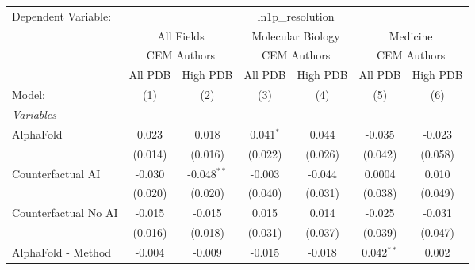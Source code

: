\begingroup
\centering
\begin{tabular}{lcccccc}
   \tabularnewline \midrule \midrule
   Dependent Variable: & \multicolumn{6}{c}{ln1p\_resolution}\\
 & \multicolumn{2}{c}{All Fields} & \multicolumn{2}{c}{Molecular Biology} & \multicolumn{2}{c}{Medicine} \\
\cmidrule(lr){2-3} \cmidrule(lr){4-5} \cmidrule(lr){6-7}
 & \multicolumn{2}{c}{CEM Authors} & \multicolumn{2}{c}{CEM Authors} & \multicolumn{2}{c}{CEM Authors} \\
\cmidrule(lr){2-3} \cmidrule(lr){4-5} \cmidrule(lr){6-7}
 & \multicolumn{1}{c}{All PDB} & \multicolumn{1}{c}{High PDB} & \multicolumn{1}{c}{All PDB} & \multicolumn{1}{c}{High PDB} & \multicolumn{1}{c}{All PDB} & \multicolumn{1}{c}{High PDB} \\
\cmidrule(lr){2-2} \cmidrule(lr){3-3} \cmidrule(lr){4-4} \cmidrule(lr){5-5} \cmidrule(lr){6-6} \cmidrule(lr){7-7}
   Model:                                                     & (1)          & (2)           & (3)           & (4)          & (5)           & (6)\\  
   \midrule
   \emph{Variables}\\
   AlphaFold                                                  & 0.023        & 0.018         & 0.041$^{*}$   & 0.044        & -0.035        & -0.023\\   
                                                              & (0.014)      & (0.016)       & (0.022)       & (0.026)      & (0.042)       & (0.058)\\   
   Counterfactual AI                                          & -0.030       & -0.048$^{**}$ & -0.003        & -0.044       & 0.0004        & 0.010\\   
                                                              & (0.020)      & (0.020)       & (0.040)       & (0.031)      & (0.038)       & (0.049)\\   
   Counterfactual No AI                                       & -0.015       & -0.015        & 0.015         & 0.014        & -0.025        & -0.031\\   
                                                              & (0.016)      & (0.018)       & (0.031)       & (0.037)      & (0.039)       & (0.047)\\   
   AlphaFold - Method                                         & -0.004       & -0.009        & -0.015        & -0.018       & 0.042$^{**}$  & 0.002\\   

\end{tabular}
